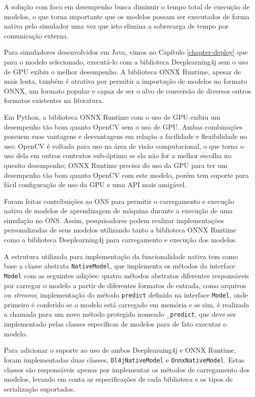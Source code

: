 A solução com foco em desempenho busca diminuir o tempo total de execução de modelos, o que torna importante que os modelos possam ser executados de forma nativa pelo simulador uma vez que isto elimina a sobrecarga de tempo por comunicação externa.

Para simuladores desenvolvidos em Java, vimos no Capítulo \ref{chapter-deploy} que para o modelo selecionado, executá-lo com a biblioteca Deeplearning4j sem o uso de GPU exibiu o melhor desempenho. A biblioteca ONNX Runtime, apesar de mais lenta, também é atrativa por permitir a importação de modelos no formato ONNX, um formato popular e capaz de ser o alvo de conversão de diversos outros formatos existentes na literatura.

Em Python, a biblioteca ONNX Runtime com o uso de GPU exibiu um desempenho tão bom quanto OpenCV sem o uso de GPU. Ambas combinações possuem suas vantagens e desvantagens em relação a facilidade e flexibilidade no uso: OpenCV é voltada para uso na área de visão computacional, o que torna o uso dela em outros contextos sub-óptimo se ela não for a melhor escolha no quesito desempenho; ONNX Runtime precisa do uso da GPU para ter um desempenho tão bom quanto OpenCV com este modelo, porém tem suporte para fácil configuração de uso da GPU e uma API mais amigável.

Foram feitas contribuições ao ONS para permitir o carregamento e execução nativa de modelos de aprendizagem de máquina durante a execução de uma simulação no ONS. Assim, pesquisadores podem realizar implementações personalizadas de seus modelos utilizando tanto a biblioteca ONNX Runtime como a biblioteca Deeplearning4j para carregamento e execução dos modelos.

A estrutura utilizada para implementação da funcionalidade nativa tem como base a classe abstrata \texttt{NativeModel}, que implementa os métodos da interface \texttt{Model} com as seguintes adições: quatro métodos abstratos diferentes responsáveis por carregar o modelo a partir de diferentes formatos de entrada, como arquivos ou \textit{streams}; implementação do método \texttt{predict} definido na interface \texttt{Model}, onde primeiro é conferido se o modelo está carregado em memória e se sim, é realizada a chamada para um novo método protegido nomeado \texttt{\_predict}, que deve ser implementado pelas classes específicas de modelos para de fato executar o modelo.

Para adicionar o suporte ao uso de ambos Deeplearning4j e ONNX Runtime, foram implementadas duas classes, \texttt{Dl4jNativeModel} e \texttt{OnnxNativeModel}. Estas classes são responsáveis apenas por implementar os métodos de carregamento dos modelos, levando em conta as especificações de cada biblioteca e os tipos de serialização suportados.


